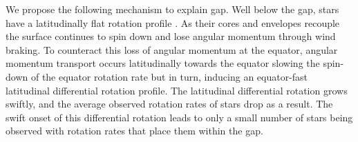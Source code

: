  
%
%

We propose the following mechanism to explain gap.
Well below the gap, stars have a latitudinally flat rotation profile \cite{}.
As their cores and envelopes recouple the surface continues to spin down and lose angular momentum through wind braking.
To counteract this loss of angular momentum at the equator, angular momentum transport occurs latitudinally towards the equator slowing the spin-down of the equator rotation rate but in turn, inducing an equator-fast latitudinal differential rotation profile.
The latitudinal differential rotation grows swiftly, and the average observed rotation rates of stars drop as a result.
The swift onset of this differential rotation leads to only a small number of stars being observed with rotation rates that place them within the gap.

